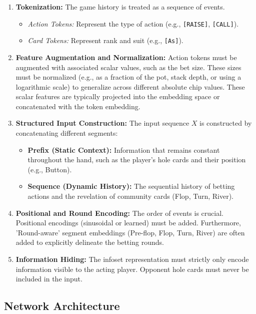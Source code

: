 \documentclass[11pt,a4paper]{article}
\begin{document}
\begin{enumerate}
    \item \textbf{Tokenization:} The game history is treated as a sequence of events.
    \begin{itemize}
        \item \textit{Action Tokens:} Represent the type of action (e.g., \texttt{[RAISE]}, \texttt{[CALL]}).
        \item \textit{Card Tokens:} Represent rank and suit (e.g., \texttt{[As]}).
    \end{itemize}

    \item \textbf{Feature Augmentation and Normalization:} Action tokens must be augmented with associated scalar values, such as the bet size. These sizes must be normalized (e.g., as a fraction of the pot, stack depth, or using a logarithmic scale) to generalize across different absolute chip values. These scalar features are typically projected into the embedding space or concatenated with the token embedding.

    \item \textbf{Structured Input Construction:} The input sequence $X$ is constructed by concatenating different segments:
    \begin{itemize}
        \item \textbf{Prefix (Static Context):} Information that remains constant throughout the hand, such as the player's hole cards and their position (e.g., Button).
        \item \textbf{Sequence (Dynamic History):} The sequential history of betting actions and the revelation of community cards (Flop, Turn, River).
    \end{itemize}

    \item \textbf{Positional and Round Encoding:} The order of events is crucial. Positional encodings (sinusoidal or learned) must be added. Furthermore, 'Round-aware' segment embeddings (Pre-flop, Flop, Turn, River) are often added to explicitly delineate the betting rounds.

    \item \textbf{Information Hiding:} The infoset representation must strictly only encode information visible to the acting player. Opponent hole cards must never be included in the input.

\end{enumerate}

\subsection{Network Architecture}
\end{document}
